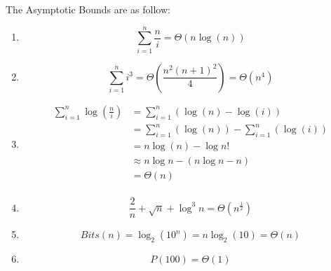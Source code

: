 \begin{homeworkProblem} %

The Asymptotic Bounds are as follow:
\begin{enumerate}[label=(\alph*)]
\item \[\sum_{i=1}^{n}{\frac{n}{i}} = \Theta\left(n\log(n)\right)\]
\item \[\sum_{i=1}^{n}{i^3} = \Theta\left(\frac{n^2(n+1)^2}{4}\right) = \Theta\left(n^4\right)\]
\item
\[
\begin{split}
\sum_{i=1}^{n}{\log(\frac{n}{i})} & = \sum_{i=1}^{n}({\log(n) - \log(i)}) \\
& = \sum_{i=1}^{n}({\log(n)}) - \sum_{i=1}^{n}({\log(i)}) \\
& = n\log(n) - \log n! \\
& \approx n\log n - (n\log n - n) \\
& = \Theta(n) \\
\end{split}
\]
\item
\[\frac{2}{n} + \sqrt{n} + \log ^3 n = \Theta\left(n^{\frac{1}{2}}\right)\]

\item
\[Bits(n) = \log_2(10^n) = n \log_2(10) = \Theta(n)\]

\item \[P(100) = \Theta(1)\]

\end{enumerate}

\end{homeworkProblem}
